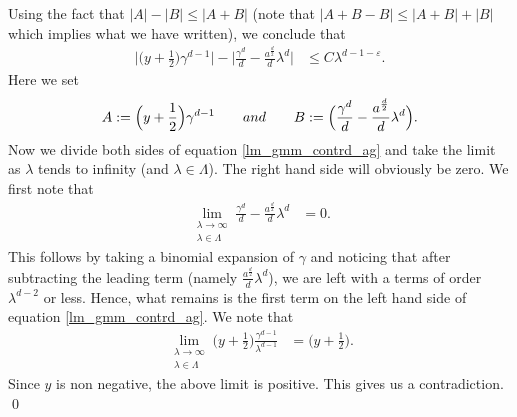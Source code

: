 \documentclass[10pt,a4paper]{amsart}
\begin{document}
Using the fact that $|A|-|B|\leq |A+B|$
(note that $|A+B-B| \leq |A+B| + |B|$ which implies what we have written), 
we conclude that 
\begin{align}
\Big|\Big(y+\frac{1}{2}\Big) \gamma^{d-1}\Big| 
-\Big| \frac{\gamma^d}{d}-\frac{a^{\frac{d}{2}}}{d} \lambda^d \Big| 
& \leq C \lambda^{d-1-\varepsilon}. \label{lm_gmm_contrd_ag}
\end{align} 
Here we set 
\[A:= \Big(y+\frac{1}{2}\Big) \gamma^{d-1} \qquad \textnormal{and} 
\qquad B:= \Big(\frac{\gamma^d}{d}-\frac{a^{\frac{d}{2}}}{d} \lambda^d\Big). \]
Now we divide both sides of equation \eqref{lm_gmm_contrd_ag} 
and take the limit as $\lambda$ tends to infinity (and $\lambda \in \Lambda$). 
The right hand side will obviously be zero. We first note that 
\begin{align*} 
\lim_{\substack{\lambda \longrightarrow \infty\\ \lambda \in \Lambda}} 
\frac{\gamma^d}{d} - \frac{a^{\frac{d}{2}}}{d} \lambda^d & = 0. 
\end{align*}
This follows by taking a binomial expansion of $\gamma$ and noticing that after subtracting the 
leading term (namely $\frac{a^{\frac{d}{2}}}{d} \lambda^{d}$), we are left with a terms of order $\lambda^{d-2}$ or less. 
Hence, what remains is the first term on the left hand side of equation 
\eqref{lm_gmm_contrd_ag}. 
We note that 
\begin{align*} 
\lim_{\substack{\lambda \longrightarrow \infty\\ \lambda \in \Lambda}} 
\Big(y+\frac{1}{2}\Big) \frac{\gamma^{d-1}}{\lambda^{d-1}} & = \Big(y+ \frac{1}{2}\Big).
\end{align*} 
Since $y$ is non negative, the above limit is positive. This gives us a contradiction. \qed 
\end{document}
